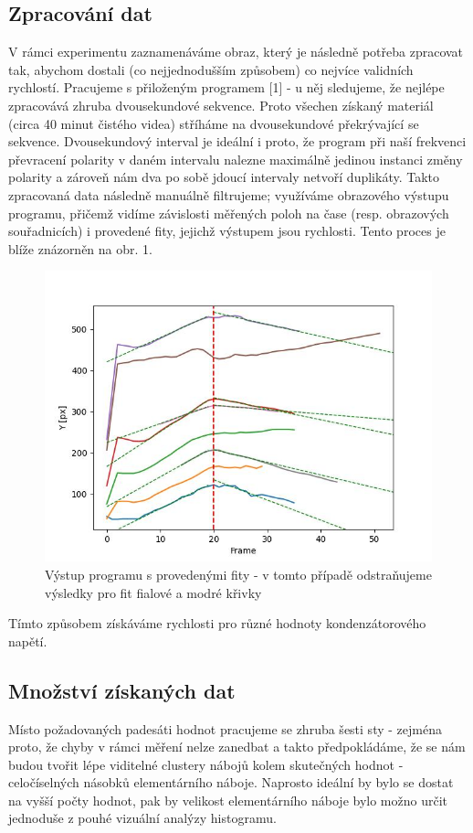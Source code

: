 \documentclass[czech,11pt,a4paper]{article}
\begin{document}
\begin{multicols}{2}
		\section{Zpracování dat}
		V rámci experimentu zaznamenáváme obraz, který je následně potřeba zpracovat tak, abychom dostali (co nejjednodušším způsobem) co nejvíce validních rychlostí. Pracujeme s přiloženým programem [1] - u něj sledujeme, že nejlépe zpracovává zhruba dvousekundové sekvence. Proto všechen získaný materiál (circa 40 minut čistého videa) stříháme na dvousekundové překrývající se sekvence. Dvousekundový interval je ideální i proto, že program při naší frekvenci převracení polarity v daném intervalu nalezne maximálně jedinou instanci změny polarity a zároveň nám dva po sobě jdoucí intervaly netvoří duplikáty.	Takto zpracovaná data následně manuálně filtrujeme; využíváme obrazového výstupu programu, přičemž vidíme závislosti měřených poloh na čase (resp. obrazových souřadnicích) i provedené fity, jejichž výstupem jsou rychlosti. Tento proces je blíže znázorněn na obr. 1.
		\begin{figure}[H]
			\centering
			\includegraphics[width=0.8\linewidth]{segment_44.mp4_plot}
			\caption{{\small Výstup programu s provedenými fity - v tomto případě odstraňujeme výsledky pro fit fialové a modré křivky}}
			\label{fig:segment44}
		\end{figure}
		Tímto způsobem získáváme rychlosti pro různé hodnoty kondenzátorového napětí. 
		\subsection{Množství získaných dat}
		Místo požadovaných padesáti hodnot pracujeme se zhruba šesti sty - zejména proto, že chyby v rámci měření nelze zanedbat a takto předpokládáme, že se nám budou tvořit lépe viditelné clustery nábojů kolem skutečných hodnot - celočíselných násobků elementárního náboje. Naprosto ideální by bylo se dostat na vyšší počty hodnot, pak by velikost elementárního náboje bylo možno určit jednoduše z pouhé vizuální analýzy histogramu. 
		

\end{multicols}
\end{document}
